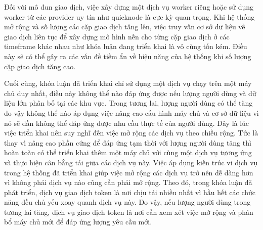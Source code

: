 Đối với mô đun giao dịch, việc xây dựng một dịch vụ worker riêng hoặc sử dụng worker từ các provider uy tín như
quicknode là cực kỳ quan trọng. Khi hệ thống mở rộng và số lượng các cặp giao
dịch tăng lên, việc truy vấn cơ sở dữ liệu về giao dịch liên tục để xây dựng mô
hình nến cho từng cặp giao dịch ở các timeframe khác nhau như khóa luận đang
triển khai là vô cùng tốn kém. Điều này sẽ có thể gây ra các vấn đề tiềm ẩn về
hiệu năng của hệ thống khi số lượng cặp giao dịch tăng cao.

Cuối cùng, khóa luận đã triển khai chỉ sử dụng một dịch vụ chạy trên một máy
chủ duy nhất, điều này không thể nào đáp ứng được nếu lượng người dùng và dữ
liệu lớn phân bố tại các khu vực. Trong tương lai, lượng
người dùng có thể tăng do vậy không thể nào áp dụng việc nâng cao cấu hình máy
chủ và cơ sở dữ liệu vì nó sẽ dần không thể đáp ứng được nhu cầu thực tế của
người dùng. Đây là lúc việc triển khai nên suy nghĩ đến việc mở rộng các dịch
vụ theo chiều rộng. Tức là thay vì nâng cao phần cứng để đáp ứng tạm thời với
lượng người dùng tăng thì hoàn toàn có thể triển khai thêm một máy chủ với cùng
một dịch vụ tương ứng và thực hiện cân bằng tải giữa các dịch vụ này. Việc áp
dụng kiến trúc vi dịch vụ trong hệ thống đã triển khai giúp việc mở rộng các
dịch vụ trở nên dễ dàng hơn vì không phải dịch vụ nào cũng cần phải mở rộng.
Theo đó,
trong khóa luận đã phát triển, dịch vụ giao dịch token là nơi chịu tải nhiều
nhất vì hầu hết các chức năng đều chủ yếu xoay quanh dịch vụ này. Do vậy, nếu
lượng người dùng trong tương lai tăng, dịch vụ giao dịch token là nơi cần xem
xét việc mở rộng và phân bổ máy chủ mới để đáp ứng lượng yêu cầu mới.

